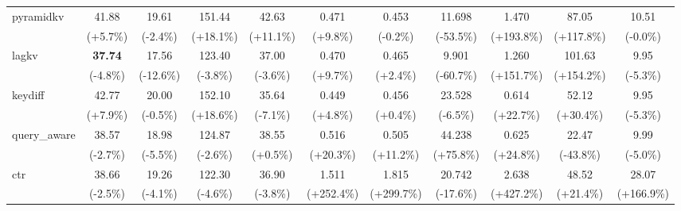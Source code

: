 \begin{table}[t]
{\begin{tabular}{l|cccccccccc}
    pyramidkv & 41.88 & 19.61 & 151.44 & 42.63 & 0.471 & 0.453 & 11.698 & 1.470 & 87.05 & 10.51 \\
     & {\tiny\color{red!70!black}(+5.7\%)} & {\tiny\color{green!60!black}(-2.4\%)} & {\tiny\color{red!70!black}(+18.1\%)} & {\tiny\color{red!70!black}(+11.1\%)} & {\tiny\color{red!70!black}(+9.8\%)} & {\tiny\color{green!60!black}(-0.2\%)} & {\tiny\color{green!60!black}(-53.5\%)} & {\tiny\color{red!70!black}(+193.8\%)} & {\tiny\color{green!60!black}(+117.8\%)} & {\tiny\color{green!60!black}(-0.0\%)} \\
    lagkv & \textbf{37.74} & 17.56 & 123.40 & 37.00 & 0.470 & 0.465 & 9.901 & 1.260 & 101.63 & 9.95 \\
     & {\tiny\color{green!60!black}(-4.8\%)} & {\tiny\color{green!60!black}(-12.6\%)} & {\tiny\color{green!60!black}(-3.8\%)} & {\tiny\color{green!60!black}(-3.6\%)} & {\tiny\color{red!70!black}(+9.7\%)} & {\tiny\color{red!70!black}(+2.4\%)} & {\tiny\color{green!60!black}(-60.7\%)} & {\tiny\color{red!70!black}(+151.7\%)} & {\tiny\color{green!60!black}(+154.2\%)} & {\tiny\color{green!60!black}(-5.3\%)} \\
    keydiff & 42.77 & 20.00 & 152.10 & 35.64 & 0.449 & 0.456 & 23.528 & 0.614 & 52.12 & 9.95 \\
     & {\tiny\color{red!70!black}(+7.9\%)} & {\tiny\color{green!60!black}(-0.5\%)} & {\tiny\color{red!70!black}(+18.6\%)} & {\tiny\color{green!60!black}(-7.1\%)} & {\tiny\color{red!70!black}(+4.8\%)} & {\tiny\color{red!70!black}(+0.4\%)} & {\tiny\color{green!60!black}(-6.5\%)} & {\tiny\color{red!70!black}(+22.7\%)} & {\tiny\color{green!60!black}(+30.4\%)} & {\tiny\color{green!60!black}(-5.3\%)} \\
    query\_aware & 38.57 & 18.98 & 124.87 & 38.55 & 0.516 & 0.505 & 44.238 & 0.625 & 22.47 & 9.99 \\
     & {\tiny\color{green!60!black}(-2.7\%)} & {\tiny\color{green!60!black}(-5.5\%)} & {\tiny\color{green!60!black}(-2.6\%)} & {\tiny\color{red!70!black}(+0.5\%)} & {\tiny\color{red!70!black}(+20.3\%)} & {\tiny\color{red!70!black}(+11.2\%)} & {\tiny\color{red!70!black}(+75.8\%)} & {\tiny\color{red!70!black}(+24.8\%)} & {\tiny\color{red!70!black}(-43.8\%)} & {\tiny\color{green!60!black}(-5.0\%)} \\
    ctr & 38.66 & 19.26 & 122.30 & 36.90 & 1.511 & 1.815 & 20.742 & 2.638 & 48.52 & 28.07 \\
     & {\tiny\color{green!60!black}(-2.5\%)} & {\tiny\color{green!60!black}(-4.1\%)} & {\tiny\color{green!60!black}(-4.6\%)} & {\tiny\color{green!60!black}(-3.8\%)} & {\tiny\color{red!70!black}(+252.4\%)} & {\tiny\color{red!70!black}(+299.7\%)} & {\tiny\color{green!60!black}(-17.6\%)} & {\tiny\color{red!70!black}(+427.2\%)} & {\tiny\color{green!60!black}(+21.4\%)} & {\tiny\color{red!70!black}(+166.9\%)} \\

\end{tabular}}
\end{table}
